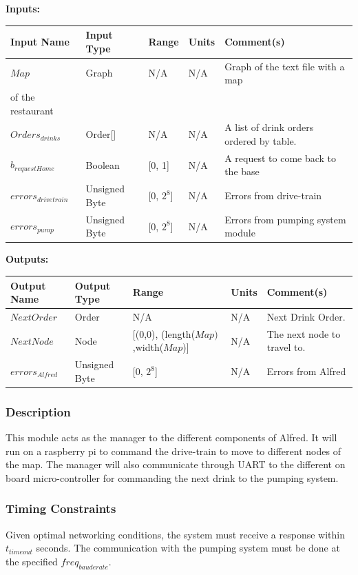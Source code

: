 \documentclass [10pt]{article}
\begin{document}
\textbf{Inputs: } 

\begin{longtable}{|l|l|l|l|l|}\hline 
	\rowcolor{tableCell}Input Name & Input Type & Range & Units & Comment(s) \\ \hline
	$ Map $ & Graph & N/A & N/A & Graph of the text file with a map \\ of the restaurant \\ \hline
	$ Orders_{drinks} $ & Order[] & N/A & N/A & A list of drink orders ordered by table. \\ \hline
	$ b_{requestHome} $ & Boolean & [0, 1]& N/A &  A request to come back to the base\\ \hline
	$ errors_{drivetrain} $ & Unsigned Byte & [0, $2^{8}$]& N/A & Errors from drive-train \\ \hline
	$  errors_{pump} $ & Unsigned Byte & [0, $2^{8}$]& N/A & Errors from pumping system module \\ \hline
\end{longtable}


\textbf{Outputs: } 
\begin{longtable}{|l|l|l|l|l|}\hline 
	\rowcolor{tableCell}Output Name & Output Type & Range & Units & Comment(s) \\ \hline
	$ NextOrder $ & Order & N/A & N/A & Next Drink Order. \\ \hline
	$ NextNode $ & Node & [(0,0), (length($Map)$,width($Map$)] & N/A & The next node to travel to. \\ \hline
	$  errors_{Alfred} $ & Unsigned Byte & [0, $2^{8}$]& N/A & Errors from Alfred \\ \hline
\end{longtable}

\subsubsection{Description}
This module acts as the manager to the different components of Alfred. It will run on a raspberry pi to command the drive-train to move to different nodes of the map. The manager will also communicate through UART to the different on board micro-controller for commanding the next drink to the pumping system.
\subsubsection{Timing Constraints}
Given optimal networking conditions, the system must receive a response within  $ t_{timeout} $ seconds. The communication with the pumping system must be done at the specified $freq_{bauderate}$.
\end{document}

